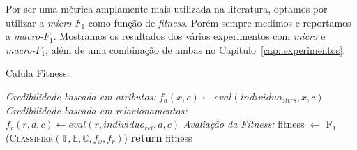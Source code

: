 


Por ser uma métrica amplamente mais utilizada na literatura, optamos por utilizar a \textit{micro-$F_1$} como função de \textit{fitness}. Porém sempre medimos e reportamos a \textit{macro-$F_1$}. Mostramos os resultados dos vários experimentos com \textit{micro} e \textit{macro-$F_1$}, além de uma combinação de ambas no Capítulo~\ref{cap::experimentos}.


\algrenewcommand{}
\algrenewcommand{}
\algrenewcommand{}
\algrenewcommand{} %

\begin{algorithm}
\centering
\caption{Calula Fitness.}
\label{alg::fitness}
\begin{algorithmic}[1]
{
{}
  \State \textit{Credibilidade baseada em atributos:}
      \State $f_a(x,c) \gets eval(individuo_{attrs}, x, c)$
    \EndFor
  \EndFor
  \State \textit{Credibilidade baseada em relacionamentos:}
            \State $f_r(r,d,c) \gets eval(r,individuo_{rel}, d, c)$
        \EndFor
    \EndFor
  \EndFor
  \State \textit{Avaliação da Fitness:}
  \State fitness $\gets$ \textsc{F$_1$}(\textsc{Classifier}$(\mathbb{T}, \mathbb{E}, \mathbb{C}, f_x, f_r)$)
  \State \textbf{return} fitness
\EndFunction
}
\end{algorithmic}
\end{algorithm}




